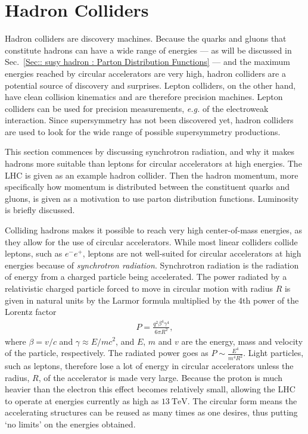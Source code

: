 \documentclass[twoside,english]{uiofysmaster}
\begin{document}
{\section{Hadron Colliders}\label{Sec:: susy hadron : Hadron Colliders}

Hadron colliders are discovery machines. Because the quarks and gluons that constitute hadrons can have a wide range of energies --- as will be discussed in Sec.~\ref{Sec:: susy hadron : Parton Distribution Functions} --- and the maximum energies reached by circular accelerators are very high, hadron colliders are a potential source of discovery and surprises. Lepton colliders, on the other hand, have clean collision kinematics and are therefore precision machines. Lepton colliders can be used for precision measurements, \textit{e.g.} of the electroweak interaction. Since supersymmetry has not been discovered yet, hadron colliders are used to look for the wide range of possible supersymmetry productions. 

This section commences by discussing synchrotron radiation, and why it makes hadrons more suitable than leptons for circular accelerators at high energies. The LHC is given as an example hadron collider. Then the hadron momentum, more specifically how momentum is distributed between the constituent quarks and gluons, is given as a motivation to use parton distribution functions. Luminosity is briefly discussed.  


Colliding hadrons makes it possible to reach very high center-of-mass energies, as they allow for the use of circular accelerators. While most linear colliders collide leptons, such as $e^- e^+$, leptons are not well-suited for circular accelerators at high energies because of \textit{synchrotron radiation}. Synchrotron radiation is the radiation of energy from a charged particle being accelerated. The power radiated by a relativistic charged particle forced to move in circular motion with radius $R$ is given in natural units by the Larmor formula \cite{larmor1897lxiii} multiplied by the 4th power of the Lorentz factor
\begin{align}
P = \frac{q^2 \beta^4 \gamma^4}{6 \pi R^2},
\end{align}
where $\beta = v/c$ and $\gamma \approx E/mc^2$, and $E$, $m$ and $v$ are the energy, mass and velocity of the particle, respectively. The radiated power goes as $P \sim \frac{E^4}{m^4 R^2}$. Light particles, such as leptons, therefore lose a lot of energy in circular accelerators unless the radius, $R$, of the accelerator is made very large. Because the proton is much heavier than the electron this effect becomes relatively small, allowing the LHC to operate at energies currently as high as $13~\mathrm{TeV}$. The circular form means the accelerating structures can be reused as many times as one desires, thus putting `no limits' on the energies obtained. 

}
\end{document}
